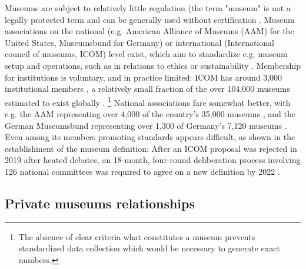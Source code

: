 \documentclass[12pt]{article}
\begin{document}
Museums are subject to relatively little regulation (the term "museum" is not a legally protected term and can be generally used without certification \parencite{Museumsbund_ICOMDE_2006_standards,Moore_2022_best,Lister_2023_marketing}.
Museum associations on the national (e.g. American Alliance of Museums (AAM) for the United States, Museumsbund for Germany) or international (International council of museums, ICOM) level exist, which aim to standardize e.g. museum setup and operations, such as in relations to ethics \parencite{ICOM_2016_ethics} or sustainability \parencite{Bickersteth_2016_environment}. 
Membership for institutions is voluntary, and in practice limited:
ICOM has around 3,000 institutional members \parencite{ICOM_2020_report19}, a relatively small fraction of the over 104,000 museums estimated to exist globally \parencite{UNESCO_2021_covid}. \footnote{The absence of clear criteria what constitutes a museum prevents standardized data collection which would be necessary to generate exact numbers.}
National associations fare somewhat better, with e.g. the AAM representing over 4,000 of the country's 35,000 museums \parencite{LOC_2019_AAM}, and the German Museumsbund representing over 1,300 \parencite{Museumsbund_2024_mitgliedmuseen} of Germany's 7,120 museums \parencite{IMF_2024_museumsstatistik}.
Even among its members promoting standards appears difficult, as shown in the establishment of the museum definition:
After an ICOM proposal was rejected in 2019 after heated debates, an 18-month, four-round deliberation process involving 126 national committees was required to agree on a new definition by 2022 \parencite{Robinson_2021_debating,Seymour_2022_definition}.




\subsection*{Private museums relationships}
\end{document}
